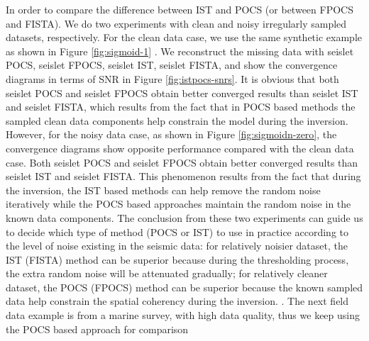 In order to compare the difference between IST and POCS (or between FPOCS and FISTA). We do two experiments with clean and noisy irregularly sampled datasets, respectively. For the clean data case, we use the same synthetic example as shown in Figure \ref{fig:sigmoid-1} . We reconstruct the missing data with seislet POCS, seislet FPOCS, seislet IST, seislet FISTA, and show the convergence diagrams in terms of SNR in Figure \ref{fig:istpocs-snrs}. It is obvious that both seislet POCS and seislet FPOCS obtain better converged results than seislet IST and seislet FISTA, which results from the fact that in POCS based methods the sampled clean data components help constrain the model during the inversion. However, for the noisy data case, as shown in Figure \ref{fig:sigmoidn-zero}, the convergence diagrams show opposite performance compared with the clean data case. Both seislet POCS and seislet FPOCS obtain better converged results than seislet IST and seislet FISTA. This phenomenon results from the fact that during the inversion, the IST based methods can help remove the random noise iteratively while the POCS based approaches maintain the random noise in the known data components. The conclusion from these two experiments can guide us to decide which type of method (POCS or IST) to use in practice according to the level of noise existing in the seismic data: for relatively noisier dataset, the IST (FISTA) method can be superior  because during the thresholding process, the extra random noise will be attenuated gradually; for relatively cleaner dataset, the POCS (FPOCS) method can be superior because the known sampled data help constrain the spatial coherency during the inversion. . The next field data example is from a marine survey, with high data quality, thus we keep using the POCS based approach for comparison 

